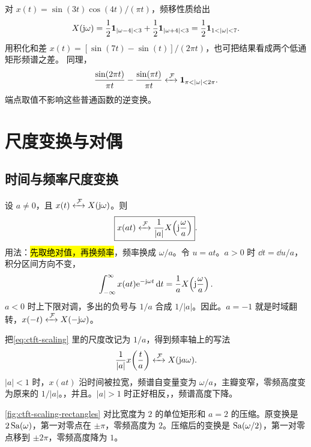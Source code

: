 \begin{example}
  \label{eg:ctft-modulated-sinc-bandpass}
  对 $x(t)=\sin(3t)\cos(4t)/(\pi t)$，频移性质给出
  \[
    X(\iu\omega)=\frac12\mathbf 1_{|\omega-4|<3}
      +\frac12\mathbf 1_{|\omega+4|<3}
      =\frac12\mathbf 1_{1<|\omega|<7}.
  \]
  用积化和差
  $x(t)=[\sin(7t)-\sin(t)]/(2\pi t)$，也可把结果看成两个低通矩形频谱之差。
  同理，
  \[
    \frac{\sin(2\pi t)}{\pi t}-\frac{\sin(\pi t)}{\pi t}
    \fourierpair \mathbf 1_{\pi<|\omega|<2\pi}.
  \]
  端点取值不影响这些普通函数的逆变换。
\end{example}

\section{尺度变换与对偶}
\label{sec:ctft-scaling-duality}

\subsection{时间与频率尺度变换}
\label{sec:ctft-scaling}

设 $a\neq 0$，且 $x(t)\mathrel{\xleftrightarrow{\,\mathcal{F}\,}} X(\mathrm{j}\omega)$。则
\begin{equation}
  \boxed{x(at)\mathrel{\xleftrightarrow{\,\mathcal{F}\,}}\frac{1}{|a|}X\!\left(\mathrm{j}\frac{\omega}{a}\right)}.
  \label{eq:ctft-scaling}
\end{equation}
用法：\hl{先取绝对值，再换频率}，频率换成 $\omega/a$。令 $u=at$。$a>0$ 时 $\dd t=\dd u/a$，积分区间方向不变，
\[
  \int_{-\infty}^{\infty}x(at)\mathrm{e}^{-\mathrm{j}\omega t}\mathop{}\!\mathrm{d} t
  =\frac{1}{a}X\!\left(\mathrm{j}\frac{\omega}{a}\right).
\]
$a<0$ 时上下限对调，多出的负号与 $1/a$ 合成 $1/|a|$。因此。$a=-1$ 就是时域翻转，$x(-t)\mathrel{\xleftrightarrow{\,\mathcal{F}\,}} X(-\mathrm{j}\omega)$。

把\cref{eq:ctft-scaling} 里的尺度改记为 $1/a$，得到频率轴上的写法
\begin{equation}
  \frac{1}{|a|}x\!\left(\frac{t}{a}\right)
  \mathrel{\xleftrightarrow{\,\mathcal{F}\,}} X(\mathrm{j} a\omega).
  \label{eq:ctft-frequency-scaling}
\end{equation}
$|a|<1$ 时，$x(at)$ 沿时间被拉宽，频谱自变量变为 $\omega/a$，主瓣变窄，零频高度变为原来的 $1/|a|$。，并且。$|a|>1$ 时正好相反，，频谱高度下降。

\cref{fig:ctft-scaling-rectangles} 对比宽度为 $2$ 的单位矩形和 $a=2$ 的压缩。原变换是 $2\operatorname{Sa}(\omega)$，第一对零点在 $\pm\pi$，零频高度为 $2$。压缩后的变换是 $\operatorname{Sa}(\omega/2)$，第一对零点移到 $\pm 2\pi$，零频高度降为 $1$。

